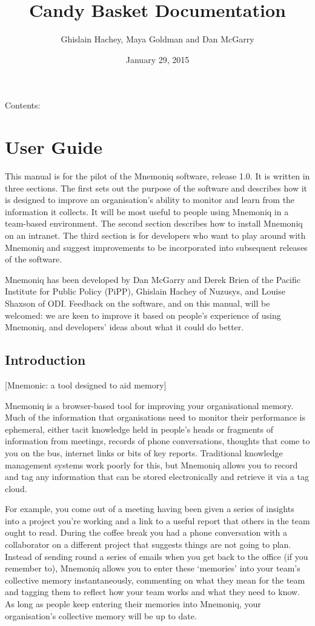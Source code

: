 \documentclass[letterpaper,10pt,english]{sphinxmanual}
\title{Candy Basket Documentation}
\date{January 29, 2015}
\author{Ghislain Hachey, Maya Goldman and Dan McGarry}
\begin{document}
\maketitle
\tableofcontents
{}\label{index::doc}


Contents:


\chapter{User Guide}
\label{user-guide:user-guide}\label{user-guide:candy-basket-s-documentation}\label{user-guide::doc}
This manual is for the pilot of the Mnemoniq software, release 1.0.
It is written in three sections.  The first sets out the purpose of
the software and describes how it is designed to improve an
organisation's ability to monitor and learn from the information it
collects.  It will be most useful to people using Mnemoniq in a
team-based environment.  The second section describes how to install
Mnemoniq on an intranet.  The third section is for developers who want
to play around with Mnemoniq and suggest improvements to be
incorporated into subsequent releases of the software.

Mnemoniq has been developed by Dan McGarry and Derek Brien of the
Pacific Institute for Public Policy (PiPP), Ghislain Hachey of
Nuzusys, and Louise Shaxson of ODI.  Feedback on the software, and on
this manual, will be welcomed: we are keen to improve it based on
people's experience of using Mnemoniq, and developers' ideas about
what it could do better.


\section{Introduction}
\label{user-guide:introduction}
{[}Mnemonic: a tool designed to aid memory{]}

Mnemoniq is a browser-based tool for improving your organisational
memory. Much of the information that organisations need to monitor
their performance is ephemeral, either tacit knowledge held in
people's heads or fragments of information from meetings, records of
phone conversations, thoughts that come to you on the bus, internet
links or bits of key reports.  Traditional knowledge management
systems work poorly for this, but Mnemoniq allows you to record and
tag any information that can be stored electronically and retrieve it
via a tag cloud.

For example, you come out of a meeting having been given a series of
insights into a project you're working and a link to a useful report
that others in the team ought to read. During the coffee break you had
a phone conversation with a collaborator on a different project that
suggests things are not going to plan.  Instead of sending round a
series of emails when you get back to the office (if you remember to),
Mnemoniq allows you to enter these `memories' into your team's
collective memory instantaneously, commenting on what they mean for
the team and tagging them to reflect how your team works and what they
need to know.  As long as people keep entering their memories into
Mnemoniq, your organisation's collective memory will be up to date.
\end{document}
